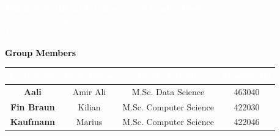 \documentclass[15pt, oneside]{memoir}
\begin{document}
\thispagestyle{empty}


\vspace{2cm}

\begin{center}
    \begin{tcolorbox}[colback=rwthbluedark!90!black, colframe=rwthbluedark!90!black, 
                      width=\textwidth, height=4cm,
                      arc=20pt,
                      boxrule=0pt,
                      halign=center, valign=center,
                      left=0pt, right=0pt]
        \textcolor{white}{\Huge \textbf{Efficient Artificial Intelligence (AI) with Rust}} \\[10pt]
        \textcolor{white}{\Huge {Final Assignment}} \\[10pt]
        \textcolor{white}{\Large {May 2025}} \\[10pt]
    \end{tcolorbox}

    \vspace{2cm}

    \textcolor{black}{\Large \textbf{Group Members}} \\ [10pt]
    \begin{tabular}{|c|c|c|c|}
        \hline
        \rowcolor{rwthbluelight}
        \rule{0pt}{0.5cm} \textbf{\textcolor{white}{Last Name}} & \textbf{\textcolor{white}{First Name}} & \textbf{\textcolor{white}{Field of Study}} & \textbf{\textcolor{white}{Student ID}} \\ \hline
        \rule{0pt}{1cm} \textbf{Aali} & Amir Ali & M.Sc. Data Science &  463040 \\ \hline
        \rule{0pt}{1cm} \textbf{Fin Braun} & Kilian & M.Sc. Computer Science & 422030  \\ \hline
        \rule{0pt}{1cm} \textbf{Kaufmann} & Marius & M.Sc. Computer Science & 422046 \\ \hline
    \end{tabular}

\end{center}
\end{document}
